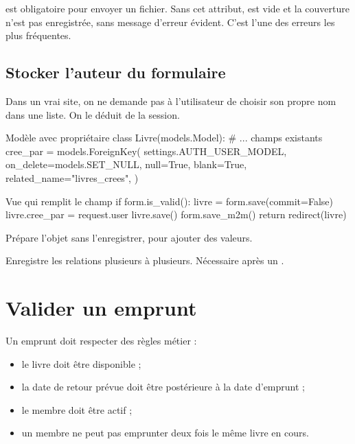\begin{attention}
 est obligatoire pour envoyer un fichier. Sans
cet attribut,  est vide et la couverture n'est pas enregistrée,
sans message d'erreur évident. C'est l'une des erreurs les plus fréquentes.
\end{attention}

\subsection{Stocker l'auteur du formulaire}

Dans un vrai site, on ne demande pas à l'utilisateur de choisir son propre nom dans
une liste. On le déduit de la session.

\begin{codebox}[python]{Modèle avec propriétaire}
class Livre(models.Model):
    # ... champs existants
    cree_par = models.ForeignKey(
        settings.AUTH_USER_MODEL,
        on_delete=models.SET_NULL,
        null=True,
        blank=True,
        related_name="livres_crees",
    )
\end{codebox}

\begin{codebox}[python]{Vue qui remplit le champ}
if form.is_valid():
    livre = form.save(commit=False)
    livre.cree_par = request.user
    livre.save()
    form.save_m2m()
    return redirect(livre)
\end{codebox}

\begin{description}[leftmargin=4.8cm,style=nextline]
  \item[\code{commit=False}] Prépare l'objet sans l'enregistrer, pour ajouter des
  valeurs.
  \item[\code{form.save\_m2m()}] Enregistre les relations plusieurs à plusieurs.
  Nécessaire après un .
\end{description}

\section{Valider un emprunt}

Un emprunt doit respecter des règles métier :
\begin{itemize}
  \item le livre doit être disponible ;
  \item la date de retour prévue doit être postérieure à la date d'emprunt ;
  \item le membre doit être actif ;
  \item un membre ne peut pas emprunter deux fois le même livre en cours.
\end{itemize}

